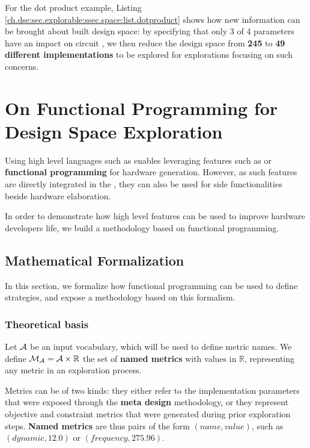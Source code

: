         For the dot product example, Listing \ref{ch.dse:sec.explorable:ssec.space:list.dotproduct} shows how new information can be brought about built design space: by specifying that only 3 of 4 parameters have an impact on circuit , we then reduce the design space from {\bf 245} to {\bf 49 different implementations} to be explored for explorations focusing on such concerns.


\section[On Functional Programming for DSE]{On Functional Programming for Design Space Exploration}
\label{ch.dse:sec.functional}

    Using high level languages such as \scala{} enables leveraging features such as  or {\bf functional programming} for hardware generation.
    However, as such features are directly integrated in the , they can also be used for side functionalities beside hardware elaboration.

    In order to demonstrate how high level features can be used to improve hardware developers life, we build a  methodology based on functional programming.

    \subsection{Mathematical Formalization}
    \label{ch.dse:sec.functional:ssec.formalization}

        In this section, we formalize how functional programming can be used to define  strategies, and expose a methodology based on this formalism. 

        \subsubsection{Theoretical basis}
    
            Let $\cal{A}$ be an input vocabulary, which will be used to define metric names.
            We define $\cal{M}_{\cal{A}} = \cal{A} \times \mathbb{R}$ the set of {\bf named metrics} with values in $\mathbb{R}$, representing any metric in an exploration process.

            Metrics can be of two kinds: they either refer to the implementation parameters that were exposed through the {\bf meta design} methodology, or they represent objective and constraint metrics that were generated during prior exploration steps.
            {\bf Named metrics} are thus pairs of the form $(name, value)$, such as $(dynamic, 12.0)$ or $(frequency, 275.96)$.

